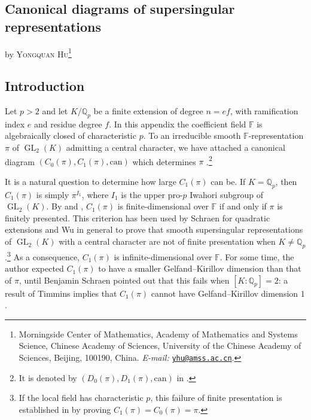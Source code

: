 \documentclass[11pt]{article}
\numberwithin{equation}{section}
\theoremstyle{definition}
\theoremstyle{remark}
\newcommand{\F}{\mathbb F}
\newcommand{\Q}{\mathbb Q}
\DeclareMathOperator{\GL}{GL}
\begin{document}
\begin{cbunit}
\appendix

\makeatletter
\let\saved@seccntformat\@seccntformat
\def\@seccntformat#1{\appendixname~\csname the#1\endcsname.\quad}
\section[Canonical diagrams of  supersingular representations]
{Canonical diagrams of  supersingular \\ representations}
\label{app:canonical-diagrams}
\let\@seccntformat\saved@seccntformat
\makeatother

\begin{center}
by \textsc{Yongquan Hu}\footnote{Morningside Center of Mathematics,
Academy of Mathematics and Systems Science, Chinese Academy of Sciences,
University of the Chinese Academy of Sciences, Beijing, 100190, China.
\textit{E-mail:} \href{mailto:yhu@amss.ac.cn}{\texttt{yhu@amss.ac.cn}}.}
\end{center}

\subsection{Introduction}

Let $p>2$ and let $K/\Q_p$ be a finite extension of degree
$n=ef$, with ramification index $e$ and residue degree $f$.
In this appendix the coefficient field $\F$ is algebraically closed
of characteristic $p$. To an irreducible smooth $\F$-representation $\pi$
of $\GL_2(K)$ admitting a central character,
we have attached a canonical diagram
$(C_0(\pi),C_1(\pi),\mathrm{can})$ which determines $\pi$
\cite[Thm.~1.1]{Hu12}.\footnote{It is denoted by
$(D_0(\pi),D_1(\pi),\mathrm{can})$ in \cite{Hu12}.}\smallskip

It is a natural question to determine how large $C_1(\pi)$ can be.
If $K=\Q_p$, then $C_1(\pi)$ is simply $\pi^{I_1}$, where
$I_1$ is the upper pro-$p$ Iwahori subgroup of $\GL_2(K)$.
By \cite[Thm.~1.3]{Hu12} and \cite[Cor.~2.10]{Sch15}, $C_1(\pi)$ is finite-dimensional over $\F$ if and only if $\pi$ is finitely presented. This criterion
has been used by Schraen \cite{Sch15} for quadratic extensions
and Wu \cite{Wu21} in general to prove that smooth  
supersingular representations of $\GL_2(K)$ with a central character
are not of finite presentation when $K\ne\Q_p$.\footnote{If the local field has characteristic $p$,
this failure of finite presentation is established in \cite{Hu12} by
proving $C_1(\pi)=C_0(\pi)=\pi$.} As a consequence, $C_1(\pi)$ is infinite-dimensional over $\F$. 
For some time, the author expected $C_1(\pi)$ to have a smaller Gelfand--Kirillov dimension than that of $\pi$, until Benjamin Schraen
pointed out that this fails when $[K:\Q_p]=2$: a result of Timmins \cite{Tim26} implies that $C_1(\pi)$ cannot have Gelfand--Kirillov dimension $1$. \smallskip


\end{cbunit}
\end{document}
